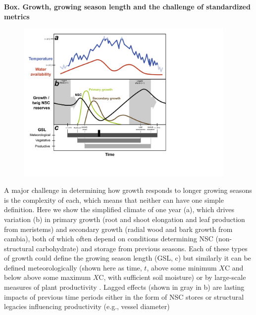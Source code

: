 \documentclass[11pt]{article}
\begin{document}
\newpage
{\bf Box. Growth, growing season length and the challenge of standardized metrics}
\begin{figure}[h!]
\includegraphics[width=0.95\textwidth]{..//figures/gslconcept/NEW_FI~1_ac_ver2.png}
\label{fig:defineGSLgrowth}
\end{figure}

A major challenge in determining how growth responds to longer growing seasons is the complexity of each, which means that neither can have one simple definition. Here we show the simplified climate of one year (a), which drives variation (b) in primary growth (root and shoot elongation and leaf production from meristems) and secondary growth (radial wood and bark growth from cambia), both of which often depend on conditions determining NSC (non-structural carbohydrate) and storage from previous seasons. Each of these types of growth could define the growing season length (GSL, c) but similarly it can be defined meteorologically (shown here as time, $t$, above some minimum $X$\degree C and below above some maximum $X$\degree C, with sufficient soil moisture) or by large-scale measures of plant productivity \citep{korner2023four}.  Lagged effects (shown in gray in b) are lasting impacts of previous time periods either in the form of NSC stores or structural legacies influencing productivity (e.g., vessel diameter)
\end{document}
